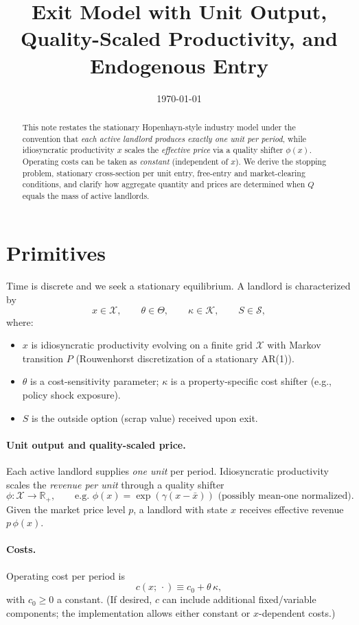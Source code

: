 \documentclass[11pt]{article}
\title{Exit Model with Unit Output, Quality-Scaled Productivity, and Endogenous Entry}
\author{}
\date{\today}
\begin{document}
\maketitle

\begin{abstract}
This note restates the stationary Hopenhayn-style industry model under the convention that \emph{each active landlord produces exactly one unit per period}, while idiosyncratic productivity $x$ scales the \emph{effective price} via a quality shifter $\phi(x)$. Operating costs can be taken as \emph{constant} (independent of $x$). We derive the stopping problem, stationary cross-section per unit entry, free-entry and market-clearing conditions, and clarify how aggregate quantity and prices are determined when $Q$ equals the mass of active landlords.
\end{abstract}

\section{Primitives}

Time is discrete and we seek a stationary equilibrium. A landlord is characterized by
\[
x\in\mathcal{X},\qquad \theta\in\Theta,\qquad \kappa\in\mathcal{K},\qquad S\in\mathcal{S},
\]
where:
\begin{itemize}
\item $x$ is idiosyncratic productivity evolving on a finite grid $\mathcal{X}$ with Markov transition $P$ (Rouwenhorst discretization of a stationary AR(1)).
\item $\theta$ is a cost-sensitivity parameter; $\kappa$ is a property-specific cost shifter (e.g., policy shock exposure).
\item $S$ is the outside option (scrap value) received upon exit.
\end{itemize}

\paragraph{Unit output and quality-scaled price.}
Each active landlord supplies \emph{one unit} per period. Idiosyncratic productivity scales the \emph{revenue per unit} through a quality shifter
\[
\phi:\mathcal{X}\to\mathbb{R}_{+},\qquad \text{e.g.\ } \phi(x)=\exp(\gamma (x-\bar x)) \text{ (possibly mean-one normalized)}.
\]
Given the market price level $p$, a landlord with state $x$ receives effective revenue $p\,\phi(x)$.

\paragraph{Costs.}
Operating cost per period is
\[
c(x;\,\cdot)\equiv c_0 + \theta\,\kappa,
\]
with $c_0\ge 0$ a constant. (If desired, $c$ can include additional fixed/variable components; the implementation allows either constant or $x$-dependent costs.)
\end{document}
